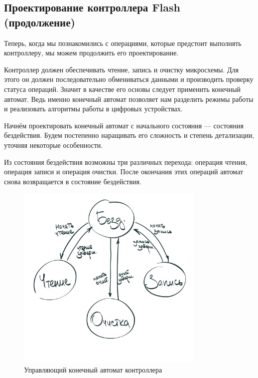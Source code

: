 \subsection{Проектирование контроллера Flash (продолжение)}
\par{Теперь, когда мы познакомились с операциями, которые предстоит выполнять контроллеру, мы можем продолжить его проектирование.}
\par{Контроллер должен обеспечивать чтение, запись и очистку микросхемы. Для этого он должен последовательно обмениваться данными и производить проверку статуса операций. Значит в качестве его основы следует применить конечный автомат. Ведь именно конечный автомат позволяет нам разделить режимы работы и реализовать алгоритмы работы в цифровых устройствах.}
\par{Начнём проектировать конечный автомат с начального состояния --- состояния бездействия. Будем постепенно наращивать его сложность и степень детализации, уточняя некоторые особенности.}

\par{Из состояния бездействия возможны три различных перехода: операция чтения, операция записи и операция очистки. После окончания этих операций автомат снова возвращается в состояние бездействия.}

\begin{figure}[H]
\centering
% 
\includegraphics[width=0.8\textwidth]{images/lab_6/fsm_simple}
\caption{Управляющий конечный автомат контроллера }
\label{fig:fsm_somple}
\end{figure}

